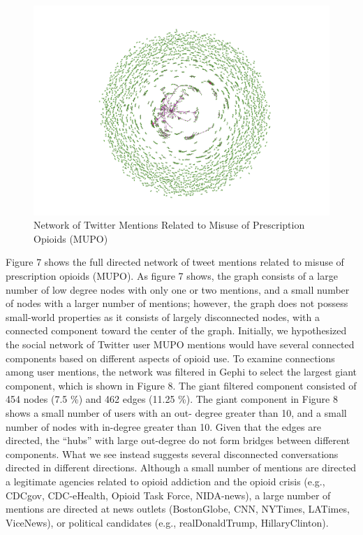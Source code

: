 \documentclass[sigconf]{acmart}
\begin{document}
\begin{figure}[!ht]
  \centering\includegraphics[width=\columnwidth]{images/Figure7.pdf}
  \caption{Network of Twitter Mentions Related to Misuse of Prescription 
  Opioids (MUPO)}
  \label{f:Figure7}
\end{figure}

Figure 7 shows the full directed network of tweet mentions related to misuse
of prescription opioids (MUPO). As figure 7 shows, the graph consists of a 
large number of low degree nodes with only one or two mentions, and a small 
number of nodes with a larger number of mentions; however, the graph does 
not possess small-world properties as it consists of largely disconnected 
nodes, with a connected component toward the center of the graph. 
Initially, we hypothesized the social network of Twitter user MUPO mentions 
would have several connected components based on different aspects of opioid use.  
To examine connections among user mentions, the network was filtered in Gephi 
to select the largest giant component, which is shown in Figure 8. The giant 
filtered component consisted of 454 nodes (7.5 \%) and 462 edges (11.25 \%). 
The giant component in Figure 8 shows a small number of users with an out-
degree greater than 10, and a small number of nodes with in-degree 
greater than 10. Given that the edges are directed, the ``hubs'' with 
large out-degree do not form bridges between different components. What we
see instead suggests several disconnected conversations directed in different
directions. Although a small number of mentions are directed a legitimate 
agencies related to opioid addiction and the opioid crisis (e.g., CDCgov, 
CDC-eHealth, Opioid Task Force, NIDA-news), a large number of mentions are 
directed at news outlets (BostonGlobe, CNN, NYTimes, LATimes, ViceNews), or 
political candidates (e.g., realDonaldTrump, HillaryClinton). 
\end{document}
